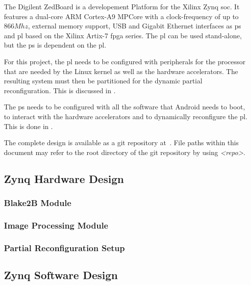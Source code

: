 The Digilent ZedBoard is a developement Platform for the Xilinx Zynq \gls{soc}.
It features a dual-core ARM Cortex-A9 MPCore with a clock-frequency of up to
$866 Mhz$, external memory support, USB and Gigabit Ethernet interfaces as
\gls{ps} and \gls{pl} based on the Xilinx Artix-7 \gls{fpga} series.
The \gls{pl} can be used stand-alone, but the \gls{ps} is dependent on the
\gls{pl}.

For this project, the \gls{pl} needs to be configured with peripherals for the
processor that are needed by the Linux kernel as well as the hardware
accelerators.
The resulting system must then be partitioned for the dynamic partial
reconfiguration.
This is discussed in .

The \gls{ps} needs to be configured with all the software that Android needs to
boot, to interact with the hardware accelerators and to dynamically reconfigure
the \gls{pl}.
This is done in .

The complete design is available as a git repository at~\cite{repo}.
File paths within this document may refer to the root directory of the git
repository by using \emph{<repo>}.
\subsection{Zynq Hardware Design}\label{ssec:zynqhardwaredesign}

\subsubsection{Blake2B Module}\label{sssec:blake2bmodule}

\subsubsection{Image Processing Module}\label{sssec:imageprocessingmodule}

\subsubsection{Partial Reconfiguration Setup}\label{sssec:partialreconfigurationsetup}

\subsection{Zynq Software Design}\label{ssec:zynqsoftwaredesign}

